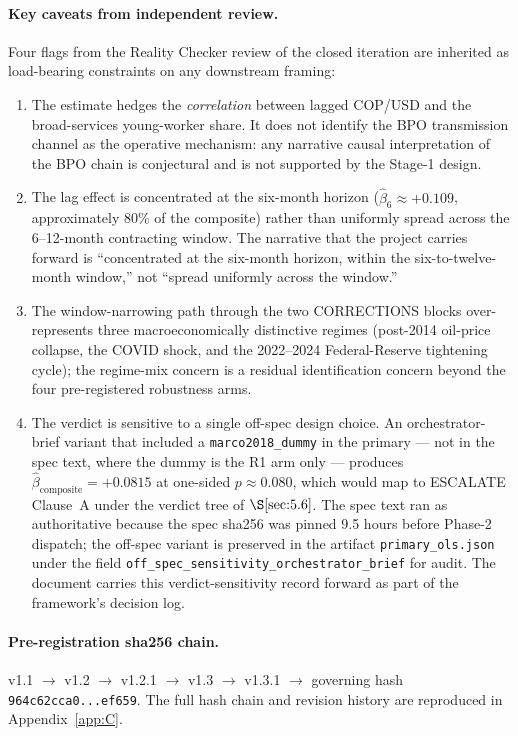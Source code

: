 \paragraph{Key caveats from independent review.} Four flags from the
Reality Checker review of the closed iteration are inherited as
load-bearing constraints on any downstream framing:
\begin{enumerate}
  \item The estimate hedges the \emph{correlation} between lagged COP/USD
    and the broad-services young-worker share. It does not identify the
    BPO transmission channel as the operative mechanism: any narrative
    causal interpretation of the BPO chain is conjectural and is not
    supported by the Stage-1 design.
  \item The lag effect is concentrated at the six-month horizon
    (\(\hat{\beta}_6 \approx +0.109\), approximately 80\% of the
    composite) rather than uniformly spread across the 6--12-month
    contracting window. The narrative that the project carries forward
    is ``concentrated at the six-month horizon, within the
    six-to-twelve-month window,'' not ``spread uniformly across
    the window.''
  \item The window-narrowing path through the two CORRECTIONS blocks
    over-represents three macroeconomically distinctive regimes
    (post-2014 oil-price collapse, the COVID shock, and the 2022--2024
    Federal-Reserve tightening cycle); the regime-mix concern is
    a residual identification concern beyond the four pre-registered
    robustness arms.
  \item The verdict is sensitive to a single off-spec design choice. An
    orchestrator-brief variant that included a \texttt{marco2018\_dummy}
    in the primary --- not in the spec text, where the dummy is the R1
    arm only --- produces \(\hat{\beta}_{\mathrm{composite}} = +0.0815\)
    at one-sided \(p \approx 0.080\), which would map to ESCALATE
    Clause~A under the verdict tree of \(\S\ref{sec:5.6}\). The spec
    text ran as authoritative because the spec sha256 was pinned
    9.5 hours before Phase-2 dispatch; the off-spec variant is preserved
    in the artifact \texttt{primary\_ols.json} under the field
    \texttt{off\_spec\_sensitivity\_orchestrator\_brief} for audit. The
    document carries this verdict-sensitivity record forward as part of
    the framework's decision log.
\end{enumerate}

\paragraph{Pre-registration sha256 chain.}
v1.1 \(\to\) v1.2 \(\to\) v1.2.1 \(\to\) v1.3 \(\to\) v1.3.1
\(\to\) governing hash
\texttt{964c62cca0...ef659}. The full hash chain and revision history
are reproduced in Appendix~\ref{app:C}.

